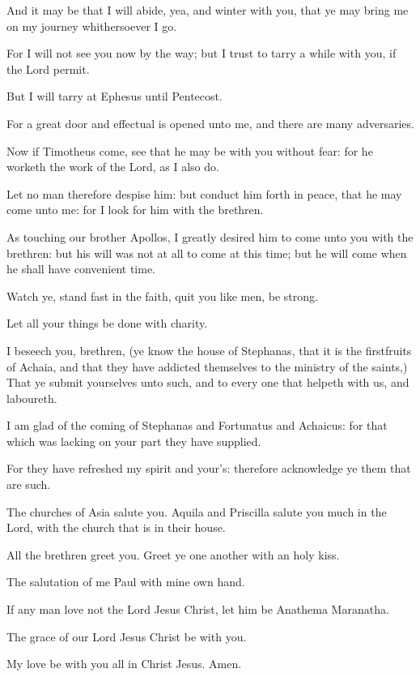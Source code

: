 \Verse And it may be that I will abide, yea, and winter with you, that ye may bring me on my journey whithersoever I go.

\Verse For I will not see you now by the way; but I trust to tarry a while with you, if the Lord permit.

\Verse But I will tarry at Ephesus until Pentecost.

\Verse For a great door and effectual is opened unto me, and there are many adversaries.

\Verse Now if Timotheus come, see that he may be with you without fear: for he worketh the work of the Lord, as I also do.

\Verse Let no man therefore despise him: but conduct him forth in peace, that he may come unto me: for I look for him with the brethren.

\Verse As touching our brother Apollos, I greatly desired him to come unto you with the brethren: but his will was not at all to come at this time; but he will come when he shall have convenient time.

\Verse Watch ye, stand fast in the faith, quit you like men, be strong.

\Verse Let all your things be done with charity.

\Verse I beseech you, brethren, (ye know the house of Stephanas, that it is the firstfruits of Achaia, and that they have addicted themselves to the ministry of the saints,) \Verse That ye submit yourselves unto such, and to every one that helpeth with us, and laboureth.

\Verse I am glad of the coming of Stephanas and Fortunatus and Achaicus: for that which was lacking on your part they have supplied.

\Verse For they have refreshed my spirit and your's: therefore acknowledge ye them that are such.

\Verse The churches of Asia salute you. Aquila and Priscilla salute you much in the Lord, with the church that is in their house.

\Verse All the brethren greet you. Greet ye one another with an holy kiss.

\Verse The salutation of me Paul with mine own hand.

\Verse If any man love not the Lord Jesus Christ, let him be Anathema Maranatha.

\Verse The grace of our Lord Jesus Christ be with you.

\Verse My love be with you all in Christ Jesus. Amen.

